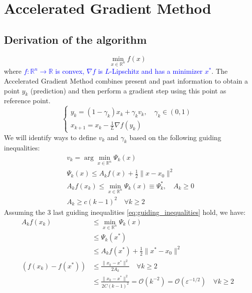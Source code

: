 \documentclass[12pt, openany]{report}
\newcommand{\R}{\mathbb{R}}
\renewcommand{\O}{\mathcal{O}}
\theoremstyle{definition}
\begin{document}
\chapter{Accelerated Gradient Method}
\section{Derivation of the algorithm}
\begin{equation}
	\min_{x \in \R^n} f(x) 
\end{equation}
where \textcolor{blue}{$f: \R^n \to \R$ is convex, $\nabla f$ is $L$-Lipschitz and has a minimizer $x^*$}. The Accelerated Gradient Method combines present and past information to obtain a point $y_k$ (prediction) and then perform a gradient step using this point as reference point.\\
\begin{equation}
	\begin{cases}
		y_k = (1-\gamma_k)x_k + \gamma_k v_k, \quad \gamma_k \in (0,1)\\
		x_{k+1} = x_k - \frac{1}{L} \nabla f(y_k)
	\end{cases}
\end{equation}
We will identify ways to define $v_k$ and $\gamma_k$ based on the following guiding inequalities:
\begin{equation}\label{eq:guiding_inequalities}
	\begin{aligned}
		&v_k = \arg \min_{x \in \R^n} \Psi_k (x)\\
		&\Psi_k (x) \leq A_k f(x) + \frac{1}{2} \|x-x_0\|^2\\
		&A_k f(x_k) \leq \min_{x \in \R^n} \Psi_k (x) \equiv \Psi_k^*, \quad A_k \geq 0\\
		&A_k \geq c(k-1)^2 \quad \forall k \geq 2
	\end{aligned}
\end{equation}
Assuming the 3 last guiding inequalities \eqref{eq:guiding_inequalities} hold, we have:
\begin{equation}
	\begin{aligned}
		A_kf(x_k) &\leq \min_{x \in \R^n} \Psi_k (x)\\
		&\leq \Psi_k(x^*)\\
		&\leq A_k f(x^*) + \frac{1}{2} \|x^*-x_0\|^2\\
		\left(f(x_k)-f(x^*)\right) &\leq \frac{\|x_k-x^*\|^2}{2 A_k} \quad \forall k \geq 2\\
		&\leq \frac{\|x_k-x^*\|^2}{2 C(k-1)^2} = \O(k^{-2}) = \O(\varepsilon^{-1/2}) \quad \forall k \geq 2
	\end{aligned}
\end{equation}
\end{document}
